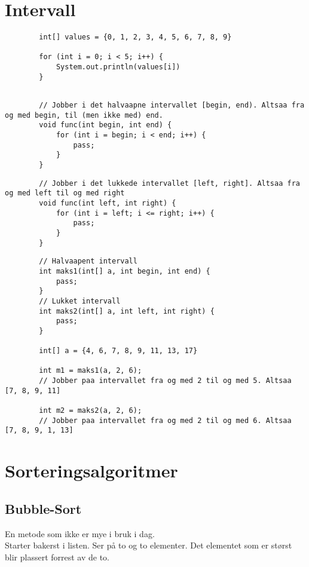 \documentclass[11pt]{article}
\begin{document}
\newpage
\section{Intervall}
\begin{lstlisting}
		int[] values = {0, 1, 2, 3, 4, 5, 6, 7, 8, 9}

		for (int i = 0; i < 5; i++) {
			System.out.println(values[i])
		}
	
	\end{lstlisting}

\begin{lstlisting}
		// Jobber i det halvaapne intervallet [begin, end). Altsaa fra og med begin, til (men ikke med) end.
		void func(int begin, int end) {
			for (int i = begin; i < end; i++) {
				pass;
			}
		}
	\end{lstlisting}
\begin{lstlisting}
		// Jobber i det lukkede intervallet [left, right]. Altsaa fra og med left til og med right
		void func(int left, int right) {
			for (int i = left; i <= right; i++) {
				pass;
			}
		}	
	\end{lstlisting}
\begin{lstlisting}
		// Halvaapent intervall 
		int maks1(int[] a, int begin, int end) {
			pass;
		}
		// Lukket intervall
		int maks2(int[] a, int left, int right) {
			pass;
		}
		
		int[] a = {4, 6, 7, 8, 9, 11, 13, 17}

		int m1 = maks1(a, 2, 6);
		// Jobber paa intervallet fra og med 2 til og med 5. Altsaa [7, 8, 9, 11]

		int m2 = maks2(a, 2, 6);
		// Jobber paa intervallet fra og med 2 til og med 6. Altsaa [7, 8, 9, 1, 13]
	\end{lstlisting}


\newpage
\section{Sorteringsalgoritmer}

\subsection{Bubble-Sort}
En metode som ikke er mye i bruk i dag. \\

Starter bakerst i listen. Ser på to og to elementer. Det elementet som er størst blir plassert forrest av de to.\\
\end{document}

